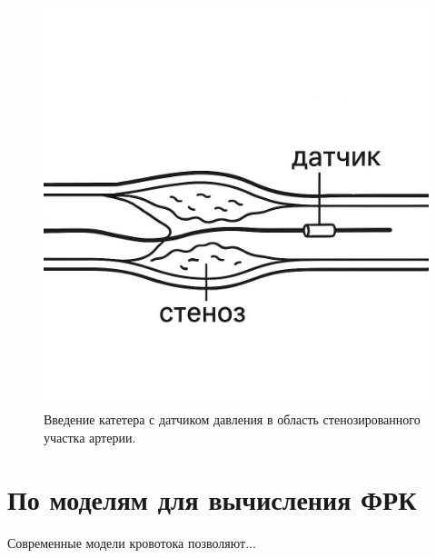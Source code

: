 \begin{figure}
	\centering
	\includegraphics[]{images/chap1/pressure_wire.jpg}
	\caption{Введение катетера с датчиком давления в область стенозированного участка артерии.}
	\label{fig:2}
\end{figure}




\section{По моделям для вычисления ФРК}
Современные модели кровотока позволяют...




